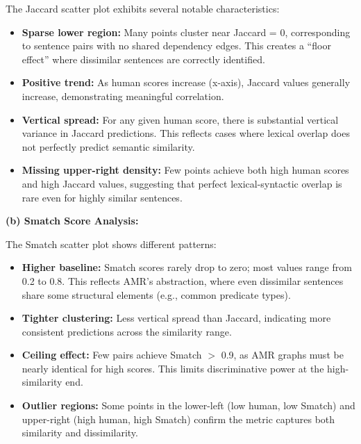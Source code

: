 \documentclass[11pt,a4paper]{article}
\begin{document}
The Jaccard scatter plot exhibits several notable characteristics:
\begin{itemize}
    \item \textbf{Sparse lower region:} Many points cluster near Jaccard = 0, corresponding to sentence pairs with no shared dependency edges. This creates a ``floor effect'' where dissimilar sentences are correctly identified.
    
    \item \textbf{Positive trend:} As human scores increase (x-axis), Jaccard values generally increase, demonstrating meaningful correlation.
    
    \item \textbf{Vertical spread:} For any given human score, there is substantial vertical variance in Jaccard predictions. This reflects cases where lexical overlap does not perfectly predict semantic similarity.
    
    \item \textbf{Missing upper-right density:} Few points achieve both high human scores and high Jaccard values, suggesting that perfect lexical-syntactic overlap is rare even for highly similar sentences.
\end{itemize}

\textbf{(b) Smatch Score Analysis:}

The Smatch scatter plot shows different patterns:
\begin{itemize}
    \item \textbf{Higher baseline:} Smatch scores rarely drop to zero; most values range from 0.2 to 0.8. This reflects AMR's abstraction, where even dissimilar sentences share some structural elements (e.g., common predicate types).
    
    \item \textbf{Tighter clustering:} Less vertical spread than Jaccard, indicating more consistent predictions across the similarity range.
    
    \item \textbf{Ceiling effect:} Few pairs achieve Smatch $>$ 0.9, as AMR graphs must be nearly identical for high scores. This limits discriminative power at the high-similarity end.
    
    \item \textbf{Outlier regions:} Some points in the lower-left (low human, low Smatch) and upper-right (high human, high Smatch) confirm the metric captures both similarity and dissimilarity.
\end{itemize}
\end{document}

